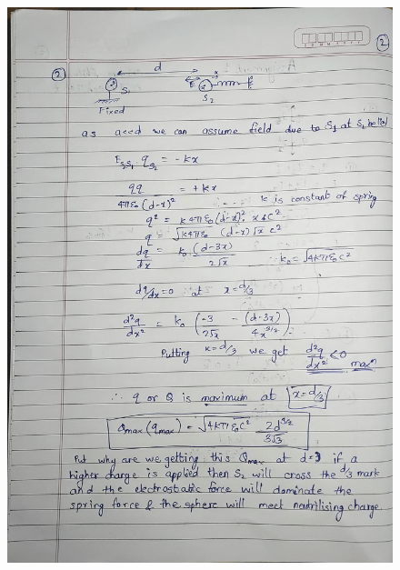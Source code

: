 \documentclass{article}
\begin{document}
\begin{figure}[H]
    \centering
    \includegraphics[width=\textwidth]{figs/written/2.jpg}
\end{figure}
\end{document}
